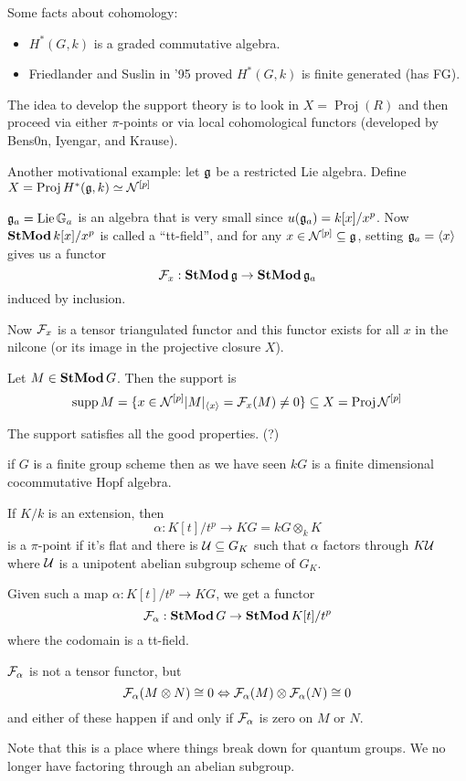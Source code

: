 \documentclass[12pt]{article}
\DeclareMathOperator{\supp}{supp}
\newcommand{\Ga}{\bbG_a}
\begin{document}
Some facts about cohomology:
\begin{itemize}
	\item $H^\ast(G,k)$ is a graded commutative algebra.
	\item Friedlander and Suslin in '95 proved $H^\ast(G,k)$ is finite generated (has FG).
\end{itemize}

The idea to develop the support theory is to look in $X=\operatorname{Proj}(R)$ and then proceed via either $\pi$-points or via local cohomological functors (developed by Bens0n, Iyengar, and Krause).

\begin{ex}
	Another motivational example: let $\mathfrak{g}$ be a restricted Lie algebra. Define $X=\operatorname{Proj}H^\ast(\mathfrak{g},k)\simeq\mathcal{N}^{[p]}$
\end{ex}

\begin{rmk}
	$\frakg_a=\operatorname{Lie}\Ga$ is an algebra that is very small since $u(\mathfrak{g}_a)=k[x]/x^p$. Now $\operatorname{\mathbf{StMod}} k[x]/x^p$ is called a ``tt-field'', and for any $x\in\mathcal{N}^{[p]}\subseteq\mathfrak{g}$,
	setting $\mathfrak{g}_a=\langle x\rangle$ gives us a functor 
	\[\mathcal{F}_x:\operatorname{\mathbf{StMod}}\mathfrak{g}\to\operatorname{\mathbf{StMod}}\mathfrak{g}_a\]
	induced by inclusion.

	Now $\mathcal{F}_x$ is a tensor triangulated functor and this functor exists for all $x$ in the nilcone (or its image in the projective closure $X$).
\end{rmk}
\begin{defn}
	Let $M\in\operatorname{\mathbf{StMod}} G$. Then the support is 
	\[\supp M=\{x\in\calN^{[p]}|M|_{\langle x\rangle}=\calF_x(M)\neq 0\}\subseteq X=\operatorname{Proj}\calN^{[p]}\]
\end{defn}


The support satisfies all the good properties. (?)

if $G$ is a finite group scheme then as we have seen $kG$ is a finite dimensional cocommutative Hopf algebra.
\begin{defn}
	If $K/k$ is an extension, then 
	\[\alpha:K[t]/t^p\to KG=kG\otimes_k K\]
	is a $\pi$-point if it's flat and there is $\mathcal{U}\subseteq G_K$ such that $\alpha$ factors through $K\mathcal{U}$ where $\mathcal{U}$ is 
	a unipotent abelian subgroup scheme of $G_K$.
\end{defn}

Given such a map $\alpha:K[t]/t^p\to KG$, we get a functor 
\[\mathcal{F}_\alpha:\operatorname{\mathbf{StMod}} G\to\operatorname{\mathbf{StMod}} K[t]/t^p\]
where the codomain is a tt-field.
\begin{rmk}
	$\mathcal{F}_\alpha$ is not a tensor functor, but 
	\[\mathcal{F}_\alpha(M\otimes N)\cong 0\Leftrightarrow \mathcal{F}_\alpha(M)\otimes\mathcal{F}_\alpha(N)\cong 0\]
	and either of these happen if and only if $\mathcal{F}_\alpha$ is zero on $M$ or $N$.
\end{rmk}
\begin{rmk}
	Note that this is a place where things break down for quantum groups. We no longer have factoring through an abelian subgroup.
\end{rmk}
\end{document}
